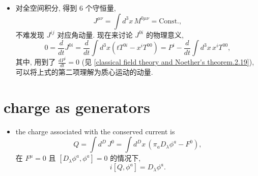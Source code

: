 \begin{itemize}
	\noindent\hdashrule[0.5ex]{\linewidth}{0.5pt}{1mm} %
	
	\item 对全空间积分, 得到 6 个守恒量,
	\begin{equation}
		J^{\mu \nu} = \int d^3 x \, M^{0 \mu \nu} = \text{Const.},
	\end{equation}
	不难发现 $J^{i j}$ 对应角动量. 现在来讨论 $J^{0 i}$ 的物理意义,
	\begin{equation}
		0 = \frac{d}{dt} J^{0 i} = \frac{d}{dt} \int d^3 x (t T^{0 i} - x^i T^{0 0}) = P^i - \frac{d}{dt} \int d^3 x \, x^i T^{0 0},
	\end{equation}
	其中, 用到了 $\frac{d P^i}{dt} = 0$ (见 \eqref{classical field theory and Noether's theorem.2.19}), 可以将上式的第二项理解为质心运动的动量.
\end{itemize}

\section{charge as generators}
\begin{itemize}
	\item the charge associated with the conserved current is
	\begin{equation}
		Q = \int d^D \, J^0 = \int d^D x \, (\pi_a D_\lambda \phi^a - F^0),
	\end{equation}
	在 $F^\mu = 0$ 且 $[D_\lambda \phi^a, \phi^a] = 0$ 的情况下,
	\begin{equation} \label{classical field theory and Noether's theorem.3.2}
		i [Q, \phi^a] = D_\lambda \phi^a.
	\end{equation}
\end{itemize}


